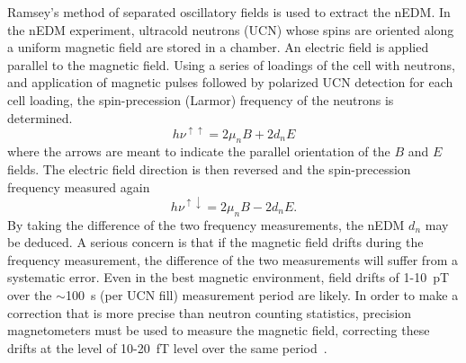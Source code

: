 Ramsey's method of separated oscillatory fields \cite{bib:ramsey} is
used to extract the nEDM.  In the nEDM experiment, ultracold neutrons
(UCN) whose spins are oriented along a uniform magnetic field are
stored in a chamber.  An electric field is applied parallel to the
magnetic field.
Using a series of loadings of the cell with neutrons, and application
of magnetic pulses followed by polarized UCN detection for each cell
loading, the spin-precession (Larmor) frequency of the neutrons is
determined.
\begin{equation}\label{my_first_eqn}  
    h\nu^{\uparrow\uparrow}=2\mu_nB+2d_nE
\end{equation}
where the arrows are meant to indicate the parallel orientation of the $B$ and $E$ fields.  The electric field direction is then reversed and the spin-precession frequency measured again
\begin{equation}\label{my_first_eqn}  
    h\nu^{\uparrow\downarrow}=2\mu_nB-2d_nE.
\end{equation}
By taking the difference of the two frequency measurements, the nEDM
$d_n$ may be deduced.
A serious concern is that if the magnetic field drifts during the
frequency measurement, the difference of the two measurements will
suffer from a systematic error.  Even in the best magnetic
environment, field drifts of 1-10~pT over the $\sim$100~s (per UCN
fill) measurement period are likely.  In order to make a correction
that is more precise than neutron counting statistics, precision
magnetometers must be used to measure the magnetic field, correcting
these drifts at the level of 10-20~fT level over the same
period~\cite{doe:website2}.

